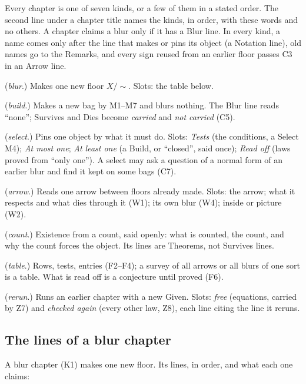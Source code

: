 Every chapter is one of seven kinds, or a few of them in a stated order. The second line under a chapter title names the kinds, in order, with these words and no others. A chapter claims a blur only if it has a Blur line. In every kind, a name comes only after the line that makes or pins its object (a Notation line), old names go to the Remarks, and every sign reused from an earlier floor passes C3 in an Arrow line.
\begin{lines}
\item[\lab{K1}] (\emph{blur}.) Makes one new floor $X/{\sim}$. Slots: the table below.
\item[\lab{K2}] (\emph{build}.) Makes a new bag by M1--M7 and blurs nothing. The Blur line reads ``none''; Survives and Dies become \emph{carried} and \emph{not carried} (C5).
\item[\lab{K3}] (\emph{select}.) Pins one object by what it must do. Slots: \emph{Tests} (the conditions, a Select M4); \emph{At most one}; \emph{At least one} (a Build, or ``closed'', said once); \emph{Read off} (laws proved from ``only one''). A select may ask a question of a normal form of an earlier blur and find it kept on some bags (C7).
\item[\lab{K4}] (\emph{arrow}.) Reads one arrow between floors already made. Slots: the arrow; what it respects and what dies through it (W1); its own blur (W4); inside or picture (W2).
\item[\lab{K5}] (\emph{count}.) Existence from a count, said openly: what is counted, the count, and why the count forces the object. Its lines are Theorems, not Survives lines.
\item[\lab{K6}] (\emph{table}.) Rows, tests, entries (F2--F4); a survey of all arrows or all blurs of one sort is a table. What is read off is a conjecture until proved (F6).
\item[\lab{K7}] (\emph{rerun}.) Runs an earlier chapter with a new Given. Slots: \emph{free} (equations, carried by Z7) and \emph{checked again} (every other law, Z8), each line citing the line it reruns.
\end{lines}

\subsection*{The lines of a blur chapter}

A blur chapter (K1) makes one new floor. Its lines, in order, and what each one claims:

